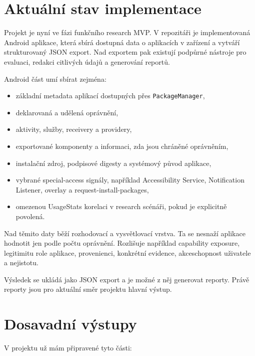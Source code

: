 \documentclass[11pt,a4paper]{article}
\begin{document}
\section{Aktuální stav implementace}

Projekt je nyní ve fázi funkčního research MVP. V repozitáři je implementovaná Android aplikace, která sbírá dostupná data o aplikacích v zařízení a vytváří strukturovaný JSON export. Nad exportem pak existují podpůrné nástroje pro evaluaci, redakci citlivých údajů a generování reportů.

Android část umí sbírat zejména:

\begin{itemize}
  \item základní metadata aplikací dostupných přes \texttt{PackageManager},
  \item deklarovaná a udělená oprávnění,
  \item aktivity, služby, receivery a providery,
  \item exportované komponenty a informaci, zda jsou chráněné oprávněním,
  \item instalační zdroj, podpisové digesty a systémový původ aplikace,
  \item vybrané special-access signály, například Accessibility Service, Notification Listener, overlay a request-install-packages,
  \item omezenou UsageStats korelaci v research scénáři, pokud je explicitně povolená.
\end{itemize}

Nad těmito daty běží rozhodovací a vysvětlovací vrstva. Ta se nesnaží aplikace hodnotit jen podle počtu oprávnění. Rozlišuje například capability exposure, legitimitu role aplikace, provenienci, konkrétní evidence, akceschopnost uživatele a nejistotu.

Výsledek se ukládá jako JSON export a je možné z něj generovat reporty. Právě reporty jsou pro aktuální směr projektu hlavní výstup.

\section{Dosavadní výstupy}

V projektu už mám připravené tyto části:
\end{document}
